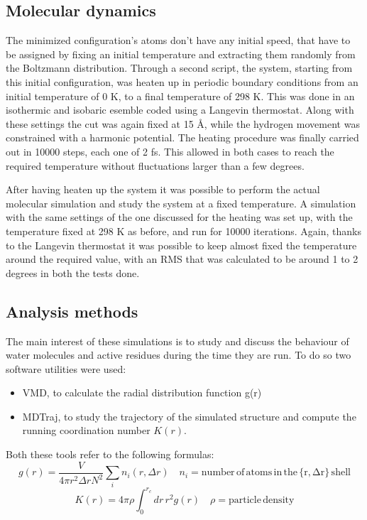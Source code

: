 \documentclass[12pt]{article}
\begin{document}
\subsection{Molecular dynamics}
The minimized configuration's atoms don't have any initial speed, that have to be assigned by fixing an initial temperature and extracting them randomly from the Boltzmann distribution. Through a second script, the system, starting from this initial configuration, was heaten up in periodic boundary conditions from an initial temperature of 0 K, to a final temperature of 298 K. This was done in an isothermic and isobaric esemble coded using a Langevin thermostat. Along with these settings the cut was again fixed at 15 \AA, while the hydrogen movement was constrained with a harmonic potential.
The heating procedure was finally carried out in 10000 steps, each one of 2 fs. This allowed in both cases to reach the required temperature without fluctuations larger than a few degrees.


After having heaten up the system it was possible to perform the actual molecular simulation and study the system at a fixed temperature. A simulation with the same settings of the one discussed for the heating was set up, with the temperature fixed at 298 K as before, and run for 10000 iterations.
Again, thanks to the Langevin thermostat it was possible to keep almost fixed the temperature around the required value, with an RMS that was calculated to be around 1 to 2 degrees in both the tests done.

\subsection{Analysis methods}
The main interest of these simulations is to study and discuss the behaviour of water molecules and active residues during the time they are run. To do so two software utilities were used:
\begin{itemize}
    \item VMD\cite{VMD}, to calculate the radial distribution function g(r)
    \item MDTraj\cite{MDTraj}, to study the trajectory of the simulated structure and compute the running coordination number $K(r)$.
\end{itemize}

Both these tools refer to the following formulas:
\begin{equation}
    g(r) = \frac{V}{4\pi r^2 \Delta r N^2}\sum_i n_i(r,\Delta r) \quad n_i = \mathrm{number \, of \, atoms \, in \, the \, \{r,\Delta r\} \, shell}
    \label{eq:gofr}
\end{equation}
\begin{equation}
    K(r) = 4\pi \rho \int_{0}^{r_c} dr \, r^2 g(r) \quad \rho = \mathrm{particle \, density}
    \label{eq:kofr}
\end{equation}
\end{document}
